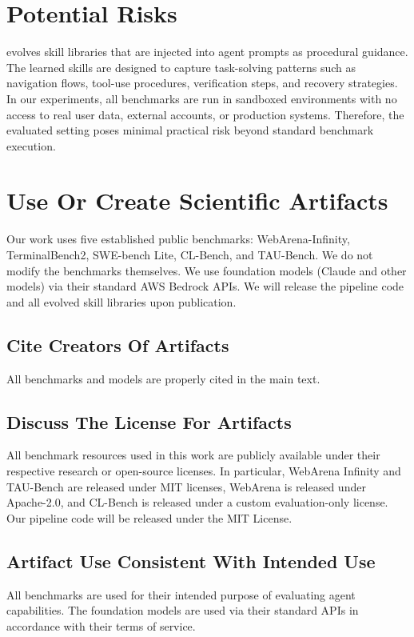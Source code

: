 \section{Potential Risks}
\algname{} evolves skill libraries that are injected into agent prompts as procedural guidance. The learned skills are designed to capture task-solving patterns such as navigation flows, tool-use procedures, verification steps, and recovery strategies. In our experiments, all benchmarks are run in sandboxed environments with no access to real user data, external accounts, or production systems. Therefore, the evaluated setting poses minimal practical risk beyond standard benchmark execution.

\section{Use Or Create Scientific Artifacts}
Our work uses five established public benchmarks: WebArena-Infinity, TerminalBench2, SWE-bench Lite, CL-Bench, and TAU-Bench. We do not modify the benchmarks themselves. We use foundation models (Claude and other models) via their standard AWS Bedrock APIs. We will release the \algname{} pipeline code and all evolved skill libraries upon publication.

\subsection{Cite Creators Of Artifacts}
All benchmarks and models are properly cited in the main text.

\subsection{Discuss The License For Artifacts}
All benchmark resources used in this work are publicly available under their respective research or open-source licenses. In particular, WebArena Infinity and TAU-Bench are released under MIT licenses, WebArena is released under Apache-2.0, and CL-Bench is released under a custom evaluation-only license. Our pipeline code will be released under the MIT License.

\subsection{Artifact Use Consistent With Intended Use}
All benchmarks are used for their intended purpose of evaluating agent capabilities. The foundation models are used via their standard APIs in accordance with their terms of service.

